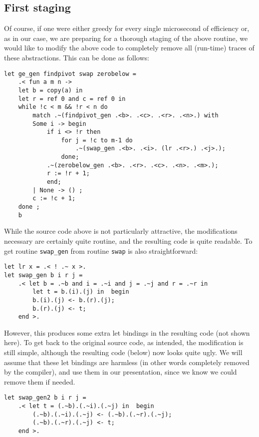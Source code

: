 \documentclass[11pt]{elsart}
\begin{document}
\subsection{First staging}
\noindent  Of course, if one were either greedy for every single
microsecond of efficiency or, as in our case, we are preparing for
a thorough staging of the above routine, we would like
to modify the above code to completely remove all (run-time) traces of 
these abstractions.  This can be done as follows:
\begin{small}
\begin{verbatim}
let ge_gen findpivot swap zerobelow =
    .< fun a m n ->
    let b = copy(a) in
    let r = ref 0 and c = ref 0 in
    while !c < m && !r < n do
        match .~(findpivot_gen .<b>. .<c>. .<r>. .<n>.) with
        Some i -> begin
            if i <> !r then
                for j = !c to m-1 do
                    .~(swap_gen .<b>. .<i>. (lr .<r>.) .<j>.);
                done;
            .~(zerobelow_gen .<b>. .<r>. .<c>. .<n>. .<m>.);
            r := !r + 1;
            end;
        | None -> () ;
        c := !c + 1;
    done ;
    b 
\end{verbatim}
\end{small}
\noindent  While the source code above is not particularly attractive, 
the modifications necessary are certainly quite routine, and
the resulting code is quite readable.  To get
routine \texttt{swap\_gen} from routine \texttt{swap} is also
straightforward:
\begin{small}
\begin{verbatim}
let lr x = .< ! .~ x >.
let swap_gen b i r j =
    .< let b = .~b and i = .~i and j = .~j and r = .~r in
        let t = b.(i).(j) in  begin
        b.(i).(j) <- b.(r).(j);
        b.(r).(j) <- t;
    end >.
\end{verbatim}
\end{small}
\noindent  However, this produces some extra let bindings in the
resulting code (not shown here).  To get back to the original source code,
as intended, the modification is still simple, although the resulting
code (below) now looks quite ugly.  We will assume that these let
bindings are harmless (in other words completely removed by the 
compiler), and use them in our presentation, since we know we could
remove them if needed.
\begin{small}
\begin{verbatim}
let swap_gen2 b i r j =
    .< let t = (.~b).(.~i).(.~j) in  begin
        (.~b).(.~i).(.~j) <- (.~b).(.~r).(.~j);
        (.~b).(.~r).(.~j) <- t;
    end >.
\end{verbatim}
\end{small}
\end{document}
